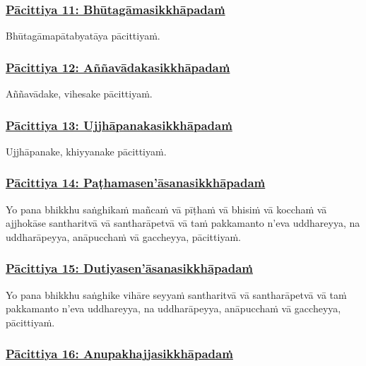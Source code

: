 \subsubsection*{\hyperref[exp11]{Pācittiya 11: Bhūtagāmasikkhāpadaṁ}}
\label{pac11}

Bhūtagāmapātabyatāya pācittiyaṁ.

\subsubsection*{\hyperref[exp12]{Pācittiya 12: Aññavādakasikkhāpadaṁ}}
\label{pac12}

Aññavādake, vihesake pācittiyaṁ.

\subsubsection*{\hyperref[exp13]{Pācittiya 13: Ujjhāpanakasikkhāpadaṁ}}
\label{pac13}

Ujjhāpanake, khiyyanake pācittiyaṁ.

\subsubsection*{\hyperref[exp14]{Pācittiya 14: Paṭhamasen'āsanasikkhāpadaṁ}}
\label{pac14}

Yo pana bhikkhu saṅghikaṁ mañcaṁ vā pīṭhaṁ vā bhisiṁ vā kocchaṁ vā ajjhokāse santharitvā vā santharāpetvā vā taṁ pakkamanto n'eva uddhareyya, na uddharāpeyya, anāpucchaṁ vā gaccheyya, pācittiyaṁ.

\subsubsection*{\hyperref[exp15]{Pācittiya 15: Dutiyasen'āsanasikkhāpadaṁ}}
\label{pac15}

Yo pana bhikkhu saṅghike vihāre seyyaṁ santharitvā vā santharāpetvā vā taṁ pakkamanto n'eva uddhareyya, na uddharāpeyya, anāpucchaṁ vā gaccheyya, pācittiyaṁ.

\subsubsection*{\hyperref[exp16]{Pācittiya 16: Anupakhajjasikkhāpadaṁ}}
\label{pac16}

